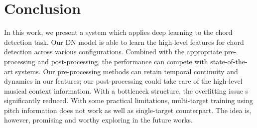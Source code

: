 \documentclass{article}
\begin{document}
\section{Conclusion}
In this work, we present a system which applies deep learning to the chord detection task. Our DN model is able to learn the high-level features for chord detection across various configurations. Combined with the appropriate pre-processing and post-processing, the performance can compete with state-of-the-art systems. Our pre-processing methods can retain temporal continuity and dynamics in our features; our post-processing could take care of the high-level musical context information. With a bottleneck structure, the overfitting issue s significantly reduced. With some practical limitations, multi-target training using pitch information does not work as well as single-target counterpart. The idea is, however, promising and worthy exploring in the future works. 


\end{document}
